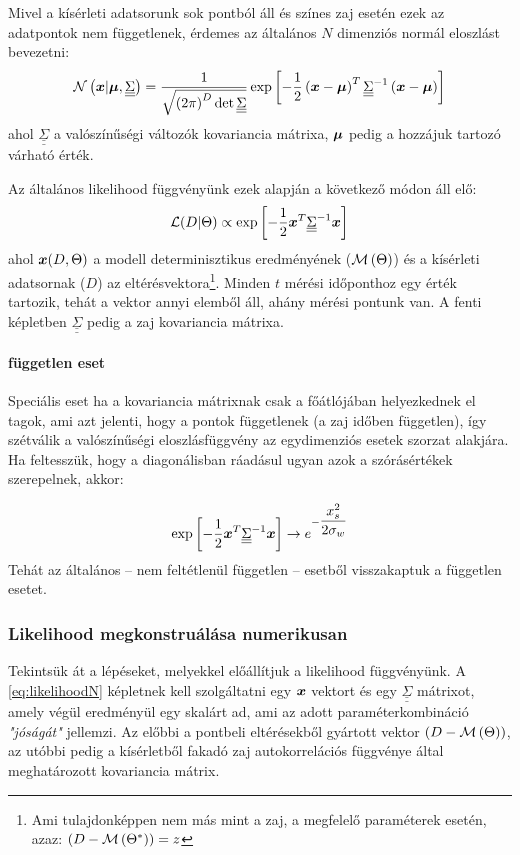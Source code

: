 Mivel a kísérleti adatsorunk sok pontból áll és színes zaj esetén ezek az adatpontok nem függetlenek, érdemes az általános $N$ dimenziós normál eloszlást bevezetni:
\begin{equation}\label{eq:gaussD}
	\mathcal{N}\left(\mbox{\boldmath$ x $}|\mbox{\boldmath$ \mu $}, \underline{\underline{ \Sigma }}\right) = \dfrac{1}{\sqrt{\left(2\pi\right)^{D} \det \underline{\underline{ \Sigma }}}}\exp\left[-\dfrac{1}{2}\left(\mbox{\boldmath$ x $}-\mbox{\boldmath$ \mu $}\right)^T \underline{\underline{ \Sigma }}^{-1}\left(\mbox{\boldmath$ x $}-\mbox{\boldmath$ \mu $}\right)\right]
\end{equation}
ahol $\underline{\underline{ \Sigma }}$ a valószínűségi változók kovariancia mátrixa, $\mbox{\boldmath$ \mu $}$ pedig a hozzájuk tartozó várható érték.


Az általános likelihood függvényünk ezek alapján a következő módon áll elő:
\begin{equation}\label{eq:likelihoodN}
	\mathcal{L}(D|\Theta) \propto \exp\left[-\dfrac{1}{2}\mbox{\boldmath$ x $}^T \underline{\underline{ \Sigma }}^{-1}\mbox{\boldmath$ x $}\right]
\end{equation}
ahol $\mbox{\boldmath$ x $}(D,\Theta)$ a modell determinisztikus eredményének ($\mathcal{M}\left(\Theta\right)$) és a kísérleti adatsornak ($D$) az eltérésvektora\footnote{Ami tulajdonképpen nem más mint a zaj, a megfelelő paraméterek esetén, azaz: $\left(D-\mathcal{M}\left(\Theta^*\right)\right) = z$}. Minden $t$ mérési időponthoz egy érték tartozik, tehát a vektor annyi elemből áll, ahány mérési pontunk van. A fenti képletben $\underline{\underline{ \Sigma }}$ pedig a zaj kovariancia mátrixa.

\paragraph{független eset}
Speciális eset ha a kovariancia mátrixnak csak a főátlójában helyezkednek el tagok, ami azt jelenti, hogy a pontok függetlenek (a zaj időben független), így szétválik a valószínűségi eloszlásfüggvény az egydimenziós esetek szorzat alakjára. Ha feltesszük, hogy a diagonálisban ráadásul ugyan azok a szórásértékek szerepelnek, akkor:

\begin{equation}\label{eq:likelihoodN_independent}
\exp\left[-\dfrac{1}{2}\mbox{\boldmath$ x $}^T \underline{\underline{ \Sigma }}^{-1}\mbox{\boldmath$ x $}\right] \rightarrow 	 e^{-\dfrac{x_s^2}{2\sigma_w}}
\end{equation}
Tehát az általános -- nem feltétlenül független -- esetből visszakaptuk a független esetet.


\subsubsection{Likelihood megkonstruálása numerikusan}
Tekintsük át a lépéseket, melyekkel előállítjuk a likelihood függvényünk. A \ref{eq:likelihoodN} képletnek kell szolgáltatni egy $\mbox{\boldmath$ x $}$ vektort és egy $\underline{\underline{\Sigma}}$ mátrixot, amely végül eredményül egy skalárt ad, ami az adott paraméterkombináció \textit{"jóságát"} jellemzi. Az előbbi a pontbeli eltérésekből gyártott vektor $\left(D-\mathcal{M}\left(\Theta\right)\right)$, az utóbbi pedig a kísérletből fakadó zaj autokorrelációs függvénye által meghatározott kovariancia mátrix.

